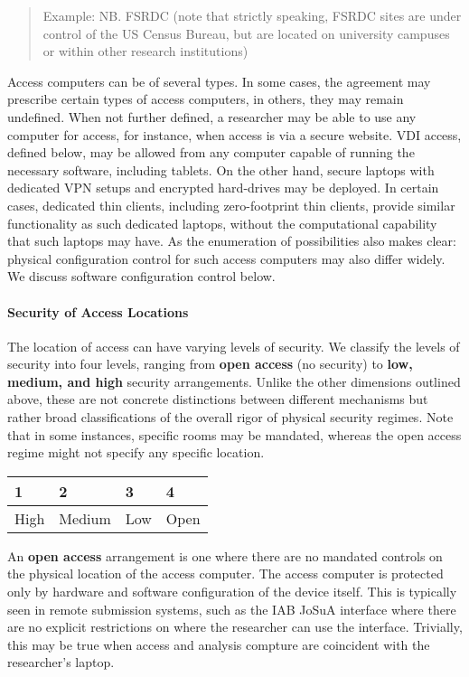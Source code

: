 \begin{quote}
Example: NB. FSRDC (note that strictly speaking, FSRDC sites are under
control of the US Census Bureau, but are located on university campuses
or within other research institutions)
\end{quote}

Access computers can be of several types. In some cases, the agreement
may prescribe certain types of access computers, in others, they may
remain undefined. When not further defined, a researcher may be able to
use any computer for access, for instance, when access is via a secure
website. VDI access, defined below, may be allowed from any computer
capable of running the necessary software, including tablets. On the
other hand, secure laptops with dedicated VPN setups and encrypted
hard-drives may be deployed. In certain cases, dedicated thin clients,
including zero-footprint thin clients, provide similar functionality as
such dedicated laptops, without the computational capability that such
laptops may have. As the enumeration of possibilities also makes clear:
physical configuration control for such access computers may also differ
widely. We discuss software configuration control below.

\hypertarget{security-of-access-locations}{%
\paragraph{Security of Access
Locations}\label{security-of-access-locations}}

The location of access can have varying levels of security. We classify
the levels of security into four levels, ranging from \textbf{open
access} (no security) to \textbf{low, medium, and high} security
arrangements. Unlike the other dimensions outlined above, these are not
concrete distinctions between different mechanisms but rather broad
classifications of the overall rigor of physical security regimes. Note
that in some instances, specific rooms may be mandated, whereas the open
access regime might not specify any specific location.

\begin{longtable}[]{@{}llll@{}}
\toprule
1 & 2 & 3 & 4\tabularnewline
\midrule
\endhead
High & Medium & Low & Open\tabularnewline
\bottomrule
\end{longtable}

An \textbf{open access} arrangement is one where there are no mandated
controls on the physical location of the access computer. The access
computer is protected only by hardware and software configuration of the
device itself. This is typically seen in remote submission systems, such
as the IAB JoSuA interface where there are no explicit restrictions on
where the researcher can use the interface. Trivially, this may be true
when access and analysis compture are coincident with the researcher's
laptop.

